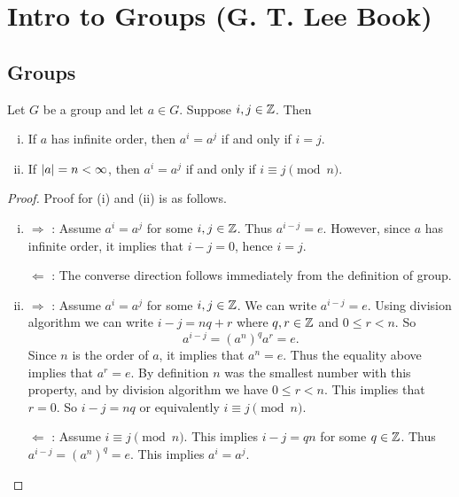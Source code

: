 
\chapter{Intro to Groups (G. T. Lee Book)}

\section{Groups}
\begin{theorem}
	Let $ G $ be a group and let $ a \in G $. Suppose $ i,j \in \mathbb{Z} $. Then
	\begin{enumerate}[(i)]
		\item If $ a $ has infinite order, then $ a^i = a^j $ if and only if $ i = j $.
		\item If $ |a| = n < \infty $, then $ a^i = a^j $ if and only if $ i\equiv j \pmod n $.  
	\end{enumerate}
\end{theorem}
\begin{proof}
	Proof for (i) and (ii) is as follows.
	\begin{enumerate}[(i)]
		\item $ \boxed{\Rightarrow} $ : Assume $ a^i = a^j $ for some $ i,j \in \mathbb{Z} $. Thus $ a^{i-j} = e $. However, since $ a $ has infinite order, it implies that $ i-j = 0 $, hence $ i=j $.
		
		\noindent $\boxed{\Leftarrow} $ : The converse direction follows immediately from the definition of group.
		
		
		\item $ \boxed{\Rightarrow} $ : Assume $ a^i = a^j $ for some $ i,j\in \mathbb{Z} $. We can write $ a^{i-j} = e $. Using division algorithm we can write $ i-j = nq + r $ where $ q,r \in \mathbb{Z} $ and $ 0 \leq r < n $. So
		\[ a^{i-j} = (a^n)^q a^r = e. \]
		Since $ n $ is the order of $ a $, it implies that $ a^n = e $. Thus the equality above implies that $ a^r = e $. By definition $ n $ was the smallest number with this property, and by division algorithm we have $ 0 \leq r < n $. This implies that $ r = 0 $. So $ i-j = nq $ or equivalently $ i \equiv j \pmod n $.
		
		\noindent $ \boxed{\Leftarrow} $ : Assume $ i\equiv j \pmod n $. This implies $ i-j = qn $ for some $ q\in \mathbb{Z} $. Thus $ a^{i-j} = (a^n)^q = e $. This implies $ a^{i} = a^j $.
		
	\end{enumerate}
\end{proof}



